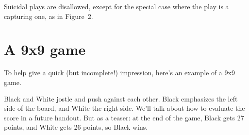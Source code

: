 \documentclass{article}
\begin{document}
\begin{center}
%
\end{center}
Suicidal plays are disallowed, except for the special case where the
play is a capturing one, as in Figure~2.







\section*{A 9x9 game}
To help give a quick (but incomplete!) impression, here's an example
of a 9x9 game.
%
\begin{center}
\hspace{1in}%
\hspace{1in}%
\end{center}
%
Black and White jostle and push against each other.  Black emphasizes
the left side of the board, and White the right side.  We'll talk
about how to evaluate the score in a future handout.  But as a teaser:
at the end of the game, Black gets 27 points, and White gets 26
points, so Black wins.
\end{document}
